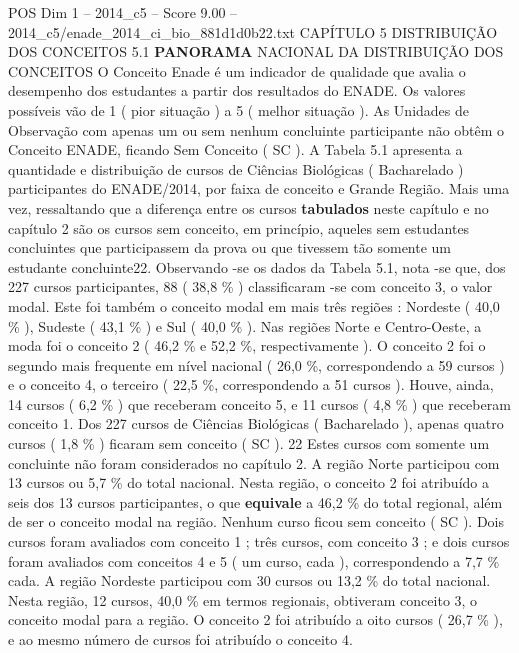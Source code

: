 \begin{textsample}{POS Dim 1 – 2014\_c5 – Score 9.00 – 2014\_c5/enade\_2014\_ci\_bio\_881d1d0b22.txt}  \label{ex:f1_pos_109}
CAPÍTULO 5 DISTRIBUIÇÃO DOS CONCEITOS 5.1 \textbf{PANORAMA} NACIONAL DA DISTRIBUIÇÃO DOS CONCEITOS O Conceito Enade é um indicador de qualidade que avalia o desempenho dos estudantes a partir dos resultados do ENADE.
Os valores possíveis vão de 1 ( pior situação ) a 5 ( melhor situação ).
As Unidades de Observação com apenas um ou sem nenhum concluinte participante não obtêm o Conceito ENADE, ficando Sem Conceito ( SC ).
A Tabela 5.1 apresenta a quantidade e distribuição de cursos de Ciências Biológicas ( Bacharelado ) participantes do ENADE/2014, por faixa de conceito e Grande Região.
Mais uma vez, ressaltando que a diferença entre os cursos \textbf{tabulados} neste capítulo e no capítulo 2 são os cursos sem conceito, em princípio, aqueles sem estudantes concluintes que participassem da prova ou que tivessem tão somente um estudante concluinte22.
Observando -se os dados da Tabela 5.1, nota -se que, dos 227 cursos participantes, 88 ( 38,8 \% ) classificaram -se com conceito 3, o valor modal.
Este foi também o conceito modal em mais três regiões : Nordeste ( 40,0 \% ), Sudeste ( 43,1 \% ) e Sul ( 40,0 \% ).
Nas regiões Norte e Centro-Oeste, a moda foi o conceito 2 ( 46,2 \% e 52,2 \%, respectivamente ).
O conceito 2 foi o segundo mais frequente em nível nacional ( 26,0 \%, correspondendo a 59 cursos ) e o conceito 4, o terceiro ( 22,5 \%, correspondendo a 51 cursos ).
Houve, ainda, 14 cursos ( 6,2 \% ) que receberam conceito 5, e 11 cursos ( 4,8 \% ) que receberam conceito 1.
Dos 227 cursos de Ciências Biológicas ( Bacharelado ), apenas quatro cursos ( 1,8 \% ) ficaram sem conceito ( SC ). 22 Estes cursos com somente um concluinte não foram considerados no capítulo 2.
A região Norte participou com 13 cursos ou 5,7 \% do total nacional.
Nesta região, o conceito 2 foi atribuído a seis dos 13 cursos participantes, o que \textbf{equivale} a 46,2 \% do total regional, além de ser o conceito modal na região.
Nenhum curso ficou sem conceito ( SC ).
Dois cursos foram avaliados com conceito 1 ; três cursos, com conceito 3 ; e dois cursos foram avaliados com conceitos 4 e 5 ( um curso, cada ), correspondendo a 7,7 \% cada.
A região Nordeste participou com 30 cursos ou 13,2 \% do total nacional.
Nesta região, 12 cursos, 40,0 \% em termos regionais, obtiveram conceito 3, o conceito modal para a região.
O conceito 2 foi atribuído a oito cursos ( 26,7 \% ), e ao mesmo número de cursos foi atribuído o conceito 4.

\end{textsample}
